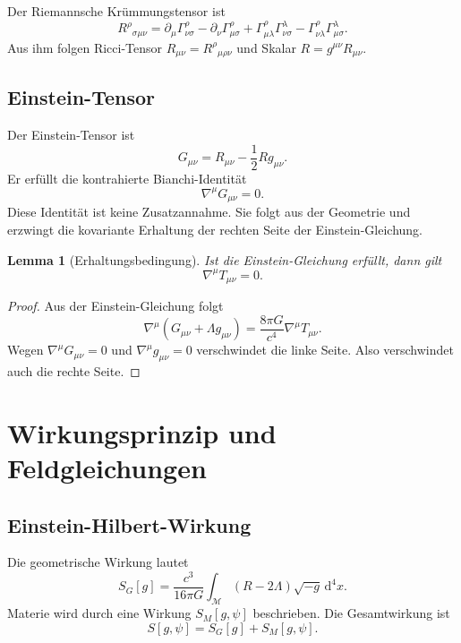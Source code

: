 \documentclass[11pt,a4paper,openany]{book}
\newtheorem{lemma}{Lemma}[chapter]
\theoremstyle{remark}
\newcommand{\M}{\mathcal{M}}
\newcommand{\diff}{\mathrm{d}}
\begin{document}
Der Riemannsche Krümmungstensor ist
\begin{equation}
R^\rho{}_{\sigma\mu\nu}=\partial_\mu\Gamma^\rho_{\nu\sigma}-\partial_\nu\Gamma^\rho_{\mu\sigma}+\Gamma^\rho_{\mu\lambda}\Gamma^\lambda_{\nu\sigma}-\Gamma^\rho_{\nu\lambda}\Gamma^\lambda_{\mu\sigma}.
\end{equation}
Aus ihm folgen Ricci-Tensor $R_{\mu\nu}=R^\rho{}_{\mu\rho\nu}$ und Skalar $R=g^{\mu\nu}R_{\mu\nu}$.

\section{Einstein-Tensor}
Der Einstein-Tensor ist
\begin{equation}
G_{\mu\nu}=R_{\mu\nu}-\frac12 Rg_{\mu\nu}.
\end{equation}
Er erfüllt die kontrahierte Bianchi-Identität
\begin{equation}
\nabla^\mu G_{\mu\nu}=0.
\end{equation}
Diese Identität ist keine Zusatzannahme. Sie folgt aus der Geometrie und erzwingt die kovariante Erhaltung der rechten Seite der Einstein-Gleichung.

\begin{lemma}[Erhaltungsbedingung]
Ist die Einstein-Gleichung erfüllt, dann gilt
\begin{equation}
\nabla^\mu T_{\mu\nu}=0.
\end{equation}
\end{lemma}
\begin{proof}
Aus der Einstein-Gleichung folgt
\[
\nabla^\mu(G_{\mu\nu}+\Lambda g_{\mu\nu})=\frac{8\pi G}{c^4}\nabla^\mu T_{\mu\nu}.
\]
Wegen $\nabla^\mu G_{\mu\nu}=0$ und $\nabla^\mu g_{\mu\nu}=0$ verschwindet die linke Seite. Also verschwindet auch die rechte Seite.
\end{proof}

\chapter{Wirkungsprinzip und Feldgleichungen}
\section{Einstein-Hilbert-Wirkung}
Die geometrische Wirkung lautet
\begin{equation}
S_G[g]=\frac{c^3}{16\pi G}\int_\M (R-2\Lambda)\sqrt{-g}\,\diff^4x.
\end{equation}
Materie wird durch eine Wirkung $S_M[g,\psi]$ beschrieben. Die Gesamtwirkung ist
\begin{equation}
S[g,\psi]=S_G[g]+S_M[g,\psi].
\end{equation}
\end{document}
